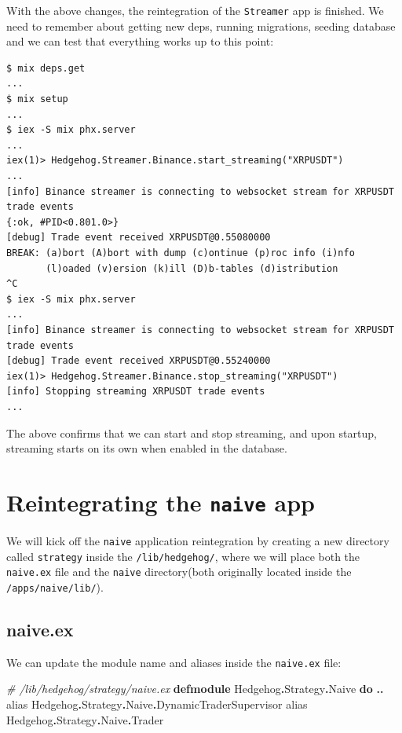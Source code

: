 \documentclass[
  oneside]{book}
\newenvironment{Shaded}{\begin{snugshade}}{\end{snugshade}}
\newcommand{\CommentTok}[1]{\textcolor[rgb]{0.56,0.35,0.01}{\textit{#1}}}
\newcommand{\ConstantTok}[1]{\textcolor[rgb]{0.56,0.35,0.01}{#1}}
\newcommand{\ImportTok}[1]{#1}
\newcommand{\KeywordTok}[1]{\textcolor[rgb]{0.13,0.29,0.53}{\textbf{#1}}}
\newcommand{\OperatorTok}[1]{\textcolor[rgb]{0.81,0.36,0.00}{\textbf{#1}}}
\begin{document}
With the above changes, the reintegration of the \texttt{Streamer} app is finished. We need to remember about getting new deps, running migrations, seeding database and we can test that everything works up to this point:

\begin{verbatim}
$ mix deps.get
...
$ mix setup
...
$ iex -S mix phx.server
...
iex(1)> Hedgehog.Streamer.Binance.start_streaming("XRPUSDT")
...
[info] Binance streamer is connecting to websocket stream for XRPUSDT trade events
{:ok, #PID<0.801.0>}
[debug] Trade event received XRPUSDT@0.55080000
BREAK: (a)bort (A)bort with dump (c)ontinue (p)roc info (i)nfo
       (l)oaded (v)ersion (k)ill (D)b-tables (d)istribution
^C
$ iex -S mix phx.server
...
[info] Binance streamer is connecting to websocket stream for XRPUSDT trade events
[debug] Trade event received XRPUSDT@0.55240000
iex(1)> Hedgehog.Streamer.Binance.stop_streaming("XRPUSDT")
[info] Stopping streaming XRPUSDT trade events
...
\end{verbatim}

The above confirms that we can start and stop streaming, and upon startup, streaming starts on its own when enabled in the database.

\section{\texorpdfstring{Reintegrating the \texttt{naive} app}{Reintegrating the naive app}}\label{reintegrating-the-naive-app}

We will kick off the \texttt{naive} application reintegration by creating a new directory called \texttt{strategy} inside the \texttt{/lib/hedgehog/}, where we will place both the \texttt{naive.ex} file and the \texttt{naive} directory(both originally located inside the \texttt{/apps/naive/lib/}).

\subsection{naive.ex}\label{naive.ex}

We can update the module name and aliases inside the \texttt{naive.ex} file:

\begin{Shaded}
\begin{Highlighting}[]
\CommentTok{\# /lib/hedgehog/strategy/naive.ex}
\KeywordTok{defmodule} \ConstantTok{Hedgehog}\OperatorTok{.}\ConstantTok{Strategy}\OperatorTok{.}\ConstantTok{Naive} \KeywordTok{do}
  \OperatorTok{..}
  \ImportTok{alias} \ConstantTok{Hedgehog}\OperatorTok{.}\ConstantTok{Strategy}\OperatorTok{.}\ConstantTok{Naive}\OperatorTok{.}\ConstantTok{DynamicTraderSupervisor}
  \ImportTok{alias} \ConstantTok{Hedgehog}\OperatorTok{.}\ConstantTok{Strategy}\OperatorTok{.}\ConstantTok{Naive}\OperatorTok{.}\ConstantTok{Trader}
\end{Highlighting}
\end{Shaded}
\end{document}
